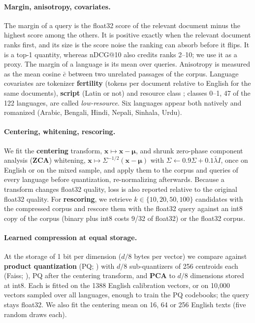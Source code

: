 \documentclass[11pt]{article}
\newcommand{\vx}{\mathbf{x}}
\newcommand{\vmu}{\boldsymbol{\mu}}
\begin{document}
\paragraph{Margin, anisotropy, covariates.} The margin of a query is the float32 score of the relevant document minus the highest score among the others. It is positive exactly when the relevant document ranks first, and its size is the score noise the ranking can absorb before it flips. It is a top-1 quantity, whereas nDCG@10 also credits ranks 2--10; we use it as a proxy. The margin of a language is its mean over queries. Anisotropy is measured as the mean cosine $\bar c$ between two unrelated passages of the corpus. Language covariates are tokenizer \textbf{fertility} (tokens per document relative to English for the same documents), \textbf{script} (Latin or not) and resource class \citep{joshi2020state}; classes 0--1, 47 of the 122 languages, are called \emph{low-resource}. Six languages appear both natively and romanized (Arabic, Bengali, Hindi, Nepali, Sinhala, Urdu).

\paragraph{Centering, whitening, rescoring.} We fit the \textbf{centering} transform, $\vx\mapsto\vx-\vmu$, and shrunk zero-phase component analysis (\textbf{ZCA}) whitening, $\vx\mapsto\Sigma^{-1/2}(\vx-\vmu)$ with $\Sigma\leftarrow0.9\Sigma+0.1\bar\lambda I$, once on English or on the mixed sample, and apply them to the corpus and queries of every language before quantization, re-normalizing afterwards. Because a transform changes float32 quality, loss is also reported relative to the original float32 quality. For \textbf{rescoring}, we retrieve $k\in\{10,20,50,100\}$ candidates with the compressed corpus and rescore them with the float32 query against an int8 copy of the corpus (binary plus int8 costs 9/32 of float32) or the float32 corpus.

\paragraph{Learned compression at equal storage.} At the storage of 1 bit per dimension ($d/8$ bytes per vector) we compare against \textbf{product quantization} (PQ; \citealp{jegou2011pq}) with $d/8$ sub-quantizers of 256 centroids each (Faiss; \citealp{johnson2019faiss}), PQ after the centering transform, and \textbf{PCA} to $d/8$ dimensions stored at int8. Each is fitted on the 1388 English calibration vectors, or on 10{,}000 vectors sampled over all languages, enough to train the PQ codebooks; the query stays float32. We also fit the centering mean on 16, 64 or 256 English texts (five random draws each).
\end{document}
